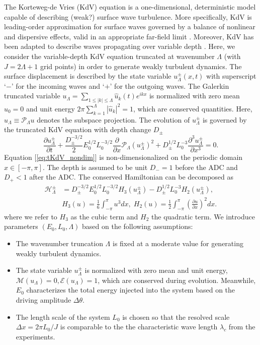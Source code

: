 \documentclass[9pt,twocolumn,twoside,lineno]{pnas-new}
\begin{document}
The Korteweg-de Vries (KdV) equation is a one-dimensional, deterministic model capable of describing {\color{blue} (weak?)} surface wave turbulence. More specifically, KdV is leading-order approximation for surface waves governed by a balance of nonlinear and dispersive effects, valid in an appropriate far-field limit \cite{johnson1997modern}. Moreover, KdV has been adapted to describe waves propagating over variable depth  \cite{johnson1997modern}. 
Here, we consider the variable-depth KdV equation truncated at wavenumber $\Lambda$ (with $J=2\Lambda+1$ grid points) in order to generate weakly turbulent dynamics. The surface displacement is described by the state variable $u_{\Lambda}^{\pm}\left(x,t\right)$ with superscript `$-$' for the incoming waves and `$+$' for the outgoing waves.
The Galerkin truncated variable $u_{\Lambda}=\sum_{1\leq\left|k\right|\leq\Lambda}\hat{u}_{k}\left(t\right)e^{ikx}$ is normalized with zero mean $\hat{u}_{0}=0$ and unit energy $2\pi\sum_{k=1}^{\Lambda}\left|\hat{u}_{k}\right|^{2}=1$, which are conserved quantities. Here, $u_{\Lambda}\equiv\mathcal{P}_{\Lambda}u$ denotes the subspace projection. The evolution of  $u_{\Lambda}^{\pm}$ is governed by the truncated KdV equation with depth change $D_{\pm}$
\begin{equation}
\frac{\partial u_{\Lambda}^{\pm}}{\partial t}+\frac{D_{\pm}^{-3/2}}{2}E_{0}^{1/2}L_{0}^{-3/2}\frac{\partial}{\partial x}\mathcal{P}_{\Lambda}\left(u_{\Lambda}^{\pm}\right)^{2}+D_{\pm}^{1/2}L_{0}^{-3}\frac{\partial^{3}u_{\Lambda}^{\pm}}{\partial x^{3}}=0. \label{eq:tKdV_nondim}
\end{equation}
Equation [\ref{eq:tKdV_nondim}] is non-dimensionalized on the periodic
domain $x\in\left[-\pi,\pi\right]$. The depth is assumed to be unit $D_{-}=1$ before the ADC and $D_{+}<1$ after the ADC. 
The conserved Hamiltonian can be decomposed as
\begin{align*}
\mathcal{H}_{\Lambda}^{\pm} & =  D_{\pm}^{-3/2}E_{0}^{1/2}L_{0}^{-3/2}H_{3}\left(u_{\Lambda}^{\pm}\right)-D_{\pm}^{1/2}L_{0}^{-3}H_{2}\left(u_{\Lambda}^{\pm}\right),\\
& H_{3}\left(u\right) =  \frac{1}{6}\int_{-\pi}^{\pi}u^{3}dx,\;H_{2}\left(u\right)=\frac{1}{2}\int_{-\pi}^{\pi}\left(\frac{\partial u}{\partial x}\right)^{2}dx.
\end{align*}
where we refer to $H_3$ as the cubic term and $H_2$ the quadratic term.
We introduce parameters $\left(E_{0},L_{0},\Lambda\right)$
based on the following assumptions:
\begin{itemize}
\item The wavenumber truncation $\Lambda$ is fixed at a moderate value
for generating weakly turbulent dynamics.
\item The state variable $u_{\Lambda}^{\pm}$ is normalized with zero mean
and unit energy, $\mathcal{M}\left(u_{\Lambda}\right)=0,\mathcal{E}\left(u_{\Lambda}\right)=1$,
which are conserved during evolution. Meanwhile, $E_{0}$ characterizes the total
energy injected into the system based on the driving amplitude $\Delta \theta$.
\item The length scale of the system $L_{0}$ is chosen so that the resolved scale $\Delta x=2\pi L_{0}/J$ is comparable to the the characteristic wave length $\lambda_{c}$ from the experiments.
\end{itemize}
\end{document}

